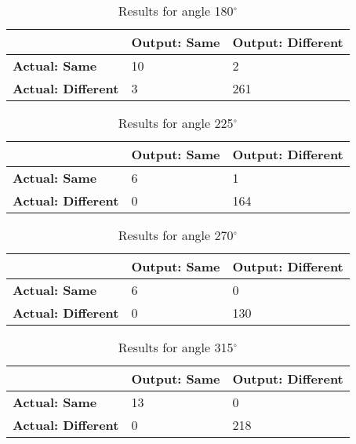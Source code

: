 \begin{table}[H]
	\centering
    \begin{tabular}{|l|l|l|}
        \hline
        \cellcolor{gray} & \textbf{Output: Same} & \textbf{Output: Different} \\ [0.5ex]
        \hline\hline
        \textbf{Actual: Same} & 10 & 2 \\ [0.5ex]
        \hline
        \textbf{Actual: Different} & 3 & 261 \\ [0.5ex]
        \hline
    \end{tabular}
    \caption{Results for angle 180$^{\circ}$}
\end{table}
            
\begin{table}[H]
	\centering
    \begin{tabular}{|l|l|l|}
        \hline
        \cellcolor{gray} & \textbf{Output: Same} & \textbf{Output: Different} \\ [0.5ex]
        \hline\hline
        \textbf{Actual: Same} & 6 & 1 \\ [0.5ex]
        \hline
        \textbf{Actual: Different} & 0 & 164 \\ [0.5ex]
        \hline
    \end{tabular}
    \caption{Results for angle 225$^{\circ}$}
\end{table}
            
\begin{table}[H]
	\centering
    \begin{tabular}{|l|l|l|}
        \hline
        \cellcolor{gray} & \textbf{Output: Same} & \textbf{Output: Different} \\ [0.5ex]
        \hline\hline
        \textbf{Actual: Same} & 6 & 0 \\ [0.5ex]
        \hline
        \textbf{Actual: Different} & 0 & 130 \\ [0.5ex]
        \hline
    \end{tabular}
    \caption{Results for angle 270$^{\circ}$}
\end{table}
            
\begin{table}[H]
	\centering
    \begin{tabular}{|l|l|l|}
        \hline
        \cellcolor{gray} & \textbf{Output: Same} & \textbf{Output: Different} \\ [0.5ex]
        \hline\hline
        \textbf{Actual: Same} & 13 & 0 \\ [0.5ex]
        \hline
        \textbf{Actual: Different} & 0 & 218 \\ [0.5ex]
        \hline
    \end{tabular}
    \caption{Results for angle 315$^{\circ}$}
\end{table}
            
